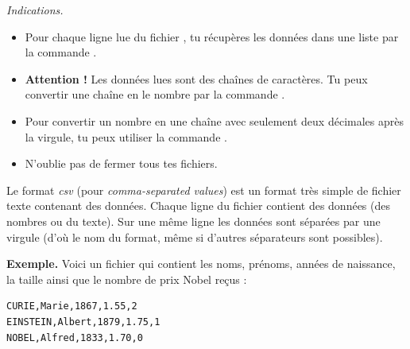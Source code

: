 \documentclass[11pt,class=report,crop=false]{standalone}
\begin{document}
\begin{activite}
\begin{enumerate}
  \emph{Indications.}
  \begin{itemize}
    	\item Pour chaque ligne lue du fichier , tu récupères les données dans  une liste par la commande .
    	
    	\item \textbf{Attention !} Les données lues sont des chaînes de caractères. Tu peux convertir une chaîne  en le nombre  par la commande .
    	
    	\item Pour convertir un nombre en une chaîne avec seulement deux décimales après la virgule, tu peux utiliser la commande .
    	
    	\item N'oublie pas de fermer tous tes fichiers.
    	
   \end{itemize}
    
\end{enumerate}   
     
\end{activite}



\begin{cours}
Le format \emph{csv} (pour  \emph{comma-separated values}) est un format très simple de fichier texte contenant des données.
Chaque ligne du fichier contient des données (des nombres ou du texte). Sur une même ligne les données sont séparées par une virgule (d'où le nom du format, même si d'autres séparateurs sont possibles).

\medskip

\textbf{Exemple.} Voici un fichier qui contient les noms, prénoms, années de naissance, la taille ainsi que le nombre de prix Nobel reçus :
\begin{center}
\begin{minipage}{0.4\textwidth}
\begin{lstlisting}
CURIE,Marie,1867,1.55,2
EINSTEIN,Albert,1879,1.75,1
NOBEL,Alfred,1833,1.70,0
\end{lstlisting}
\end{minipage}
\end{center}

\end{cours}
\end{document}
